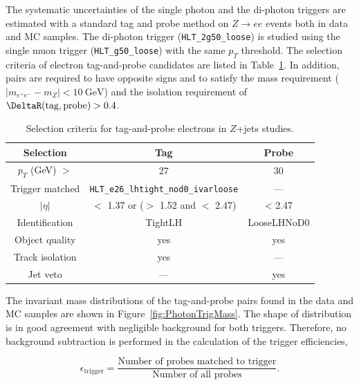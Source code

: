 The systematic uncertainties of the single photon and the di-photon triggers are estimated with a standard tag and probe method on $Z\rightarrow ee$ events both in data and MC samples. The di-photon trigger (\texttt{HLT\_2g50\_loose}) is studied using the single muon trigger (\texttt{HLT\_g50\_loose}) with the same $p_{T}$ threshold. The selection criteria of electron tag-and-probe candidates are listed in Table~\ref{tab:ZeeSelection}. In addition, pairs are required to have opposite signs and to satisfy the mass requirement ($|m_{e^{+}e^{-}} - m_{Z}| < 10~\si{\GeV}$) and the isolation requirement of $\DeltaR(\mathrm{tag}, \mathrm{probe}) > 0.4$. 

\begin{table}[!htb]
	\centering
	\begin{tabular}{ccc}
		\hline
		\hline
		Selection & Tag & Probe \\
		\hline
		$p_{T}$ (GeV) $>$ & 27 & 30 \\
		Trigger matched & \texttt{HLT\_e26\_lhtight\_nod0\_ivarloose} & --- \\
		$|\eta|$ & $<$ 1.37 or ($>$ 1.52 and $<$ 2.47) & < 2.47 \\
		Identification & TightLH & LooseLHNoD0 \\
		Object quality & yes & yes \\
		Track isolation & yes & --- \\
		Jet veto & --- & yes \\
		\hline
		\hline
	\end{tabular}
	\caption{Selection criteria for tag-and-probe electrons in $Z$+jets studies.}
	\label{tab:ZeeSelection}
\end{table}

The invariant mass distributions of the tag-and-probe pairs found in the data and MC samples are shown in Figure~\ref{fig:PhotonTrigMass}. The shape of distribution is in good agreement with negligible background for both triggers. Therefore, no background subtraction is performed in the calculation of the trigger efficiencies, 

\begin{equation}
	\label{eq:TrigEff}
    \epsilon_{\mathrm{trigger}} = \frac{\textrm{Number of probes matched to trigger}}{\textrm{Number of all probes}}.
\end{equation}

